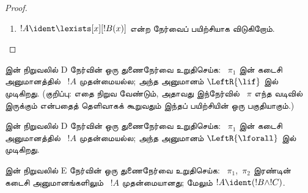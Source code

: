 \documentclass[../../../include/open-logic-section]{subfiles}
\begin{document}
\begin{proof}
\begin{enumerate}
!!{proof}~$\pi_1'$
இன் இறுதித் தொடரணி
$\Gamma \Sequent \Delta, !B(c)$;
இங்கு~$c$ என்பது
ஒரு
$\RightR{\lforall}$
அனுமானத்தின்
தனிமாறி.
எனவே~$c$
ஆனது
$!B(x)$,
$\Gamma$,
~$\Delta$
ஆகியவற்றில்
வராது.
!!{proof}~$\pi$
ஒழுங்கானது எனக்
கொள்கிறோம்;
ஆகவே~$c$
இந்த
$\RightR{\lforall}$
அனுமானத்திற்கு
மட்டுமே தனிமாறி;
அதன் மேலே மட்டுமே
வருகிறது.
அதாவது~$\pi_1'$
இல் மட்டுமே
வருகிறது;
~$\pi_1'$ இல்
உள்ள வேறோர்
அனுமானத்தின்
தனிமாறி அல்ல.
~$\pi_2$ இல்
$c$ வராததால்
~$t$ இலும்
அது வராது.
மூலம்
!!{proof}~$\Subst{\pi_1'}{t}{c}$
ஆனது
$\Gamma \Sequent \Delta, !B(t)$
இன் !!a{proof}.
இப்போது
பின்வரும்
!!{proof} க்குத்
தொகுத்தறிதல்
கருதுகோளைப்
பயன்படுத்துகிறோம்:
\[
\AxiomC{}
\RightLabel{$\Subst{\pi_1'}{t}{c}$}
\Deduce$\Gamma \fCenter \Delta, !B(t)$
\AxiomC{}
\RightLabel{$\pi_2''$}
\Deduce$!B(t), \Gamma \fCenter \Delta$
\RightLabel{\CutCS}
\BinaryInf$\Gamma \fCenter \Delta$
\DisplayProof
\]
(இங்கு வெட்டு
!!{formula}~$!B(t)$;
எனவே~$\pi$
ஐவிடக் குறைந்த
வெட்டுத் தரமுள்ள
!!{proof} என்பதால்
தொகுத்தறிதல்
கருதுகோள் பொருந்தும்.)
\item $!A \ident \lexists[x][!B(x)]$
என்ற நேர்வைப்
பயிற்சியாக விடுகிறோம்.
\end{enumerate}
\end{proof}

\begin{prob}
இன் நிறுவலில்
D நேர்வின்
ஒரு துணைநேர்வை
உறுதிசெய்க:
~$\pi_1$ இன்
கடைசி அனுமானத்தில்
~$!A$ முதன்மையல்ல;
அந்த அனுமானம்
$\LeftR{\lif}$
இல் முடிகிறது.
(குறிப்பு:
எதை நிறுவ வேண்டும்,
அதாவது இந்நேர்வில்
~$\pi$ எந்த
வடிவில் இருக்கும்
என்பதைத் தெளிவாகக்
கூறுவதும் இந்தப்
பயிற்சியின் ஒரு
பகுதியாகும்.)
\end{prob}

\begin{prob}
இன் நிறுவலில்
D நேர்வின்
ஒரு துணைநேர்வை
உறுதிசெய்க:
~$\pi_1$ இன்
கடைசி அனுமானத்தில்
~$!A$ முதன்மையல்ல;
அந்த அனுமானம்
$\LeftR{\lforall}$
இல் முடிகிறது.
\end{prob}

\begin{prob}
இன் நிறுவலில்
E நேர்வின்
ஒரு துணைநேர்வை
உறுதிசெய்க:
~$\pi_1$,~$\pi_2$
இரண்டின் கடைசி
அனுமானங்களிலும்
~$!A$ முதன்மையானது;
மேலும்
$!A \ident (!B \land !C)$.
\end{prob}
\end{document}
